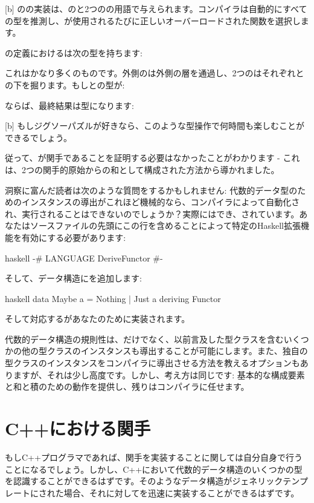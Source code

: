 [b]
のの実装は、のと2つのの用語で与えられます。コンパイラは自動的にすべての型を推測し、が使用されるたびに正しいオーバーロードされた関数を選択します。

の定義におけるは次の型を持ちます: 

これはかなり多くのものです。外側のは外側の層を通過し、2つのはそれぞれとの下を掘ります。もしとの型が: 

ならば、最終結果は型になります: 

[b]
もしジグソーパズルが好きなら、このような型操作で何時間も楽しむことができるでしょう。

従って、が関手であることを証明する必要はなかったことがわかります - これは、2つの関手的原始からの和として構成された方法から導かれました。

洞察に富んだ読者は次のような質問をするかもしれません: 代数的データ型のためのインスタンスの導出がこれほど機械的なら、コンパイラによって自動化され、実行されることはできないのでしょうか？実際にはでき、されています。あなたはソースファイルの先頭にこの行を含めることによって特定のHaskell拡張機能を有効にする必要があります: 

\begin{snip}{haskell}
{-# LANGUAGE DeriveFunctor #-}
\end{snip}
そして、データ構造にを追加します: 

\begin{snip}{haskell}
data Maybe a = Nothing | Just a deriving Functor
\end{snip}
そして対応するがあなたのために実装されます。

代数的データ構造の規則性は、だけでなく、以前言及した型クラスを含むいくつかの他の型クラスのインスタンスも導出することが可能にします。また、独自の型クラスのインスタンスをコンパイラに導出させる方法を教えるオプションもありますが、それは少し高度です。しかし、考え方は同じです: 基本的な構成要素と和と積のための動作を提供し、残りはコンパイラに任せます。

\section{C++における関手}

もしC++プログラマであれば、関手を実装することに関しては自分自身で行うことになるでしょう。しかし、C++において代数的データ構造のいくつかの型を認識することができるはずです。そのようなデータ構造がジェネリックテンプレートにされた場合、それに対してを迅速に実装することができるはずです。

